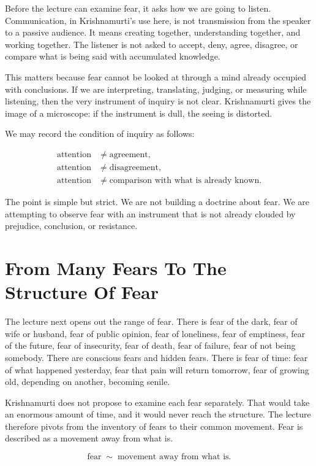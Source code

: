 Before the lecture can examine fear, it asks how we are going to listen. Communication, in Krishnamurti's use here, is not transmission from the speaker to a passive audience. It means creating together, understanding together, and working together. The listener is not asked to accept, deny, agree, disagree, or compare what is being said with accumulated knowledge.

This matters because fear cannot be looked at through a mind already occupied with conclusions. If we are interpreting, translating, judging, or measuring while listening, then the very instrument of inquiry is not clear. Krishnamurti gives the image of a microscope: if the instrument is dull, the seeing is distorted.

We may record the condition of inquiry as follows:

\begin{align}
\text{attention} &\neq \text{agreement},\\
\text{attention} &\neq \text{disagreement},\\
\text{attention} &\neq \text{comparison with what is already known}.
\end{align}

The point is simple but strict. We are not building a doctrine about fear. We are attempting to observe fear with an instrument that is not already clouded by prejudice, conclusion, or resistance.

\section{From Many Fears To The Structure Of Fear}

The lecture next opens out the range of fear. There is fear of the dark, fear of wife or husband, fear of public opinion, fear of loneliness, fear of emptiness, fear of the future, fear of insecurity, fear of death, fear of failure, fear of not being somebody. There are conscious fears and hidden fears. There is fear of time: fear of what happened yesterday, fear that pain will return tomorrow, fear of growing old, depending on another, becoming senile.

Krishnamurti does not propose to examine each fear separately. That would take an enormous amount of time, and it would never reach the structure. The lecture therefore pivots from the inventory of fears to their common movement. Fear is described as a movement away from what is.

\begin{equation}
\text{fear}
\;\sim\;
\text{movement away from what is}.
\end{equation}

